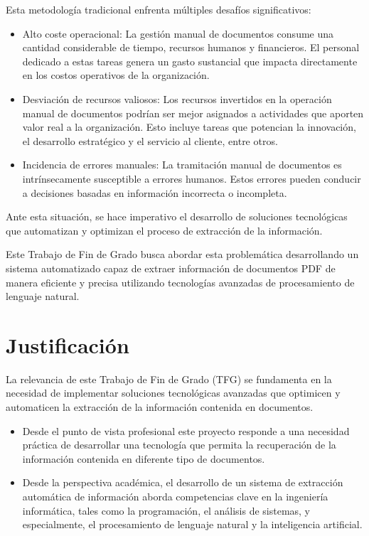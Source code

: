 Esta metodología tradicional enfrenta múltiples desafíos significativos:

\begin{itemize}
    \item Alto coste operacional: La gestión manual de documentos consume una cantidad considerable de tiempo, recursos
    humanos y financieros.
    El personal dedicado a estas tareas genera un gasto sustancial que impacta directamente en los costos operativos de
    la organización.
    \item
    Desviación de recursos valiosos: Los recursos invertidos en la operación manual de documentos podrían ser mejor
    asignados a actividades que aporten valor real a la organización.
    Esto incluye tareas que potencian la innovación, el desarrollo estratégico y el servicio al cliente, entre otros.
    \item Incidencia de errores manuales: La tramitación manual de documentos es intrínsecamente susceptible a errores
    humanos.
    Estos errores pueden conducir a decisiones basadas en información incorrecta o incompleta.
\end{itemize}

Ante esta situación, se hace imperativo el desarrollo de soluciones tecnológicas que automatizan y optimizan el proceso
de extracción de la información.

Este Trabajo de Fin de Grado busca abordar esta problemática desarrollando un sistema automatizado capaz de extraer
información de documentos PDF de manera eficiente y precisa utilizando tecnologías avanzadas de procesamiento de
lenguaje natural.

\section*{Justificación}
La relevancia de este Trabajo de Fin de Grado (TFG) se fundamenta en la necesidad de implementar soluciones tecnológicas
avanzadas que optimicen y automaticen la extracción de la información contenida en documentos.

\begin{itemize}
    \item
    Desde el punto de vista profesional este proyecto responde a una necesidad práctica de desarrollar una tecnología
    que permita la recuperación de la información contenida en diferente tipo de documentos.
    \item Desde la perspectiva académica, el desarrollo de un sistema de extracción automática de información aborda
    competencias clave en la ingeniería informática, tales como la programación, el análisis de sistemas, y
    especialmente, el procesamiento de lenguaje natural y la inteligencia artificial.
\end{itemize}

